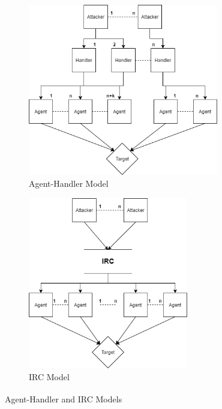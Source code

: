 \begin{figure}[h]
	\begin{subfigure}{0.5\textwidth}
		\includegraphics[width=0.9\linewidth, height=7.5cm]{img/ddos_agent_handler_model.png} 
		\caption{Agent-Handler Model}
	\end{subfigure}
	\begin{subfigure}{0.5\textwidth}
		\includegraphics[width=0.9\linewidth, height=7.5cm]{img/ddos_irc_model.png}
		\caption{IRC Model}
	\end{subfigure}
	\caption{Agent-Handler and IRC Models\textsuperscript{\cite{specht2003taxonomies}}}
\end{figure}